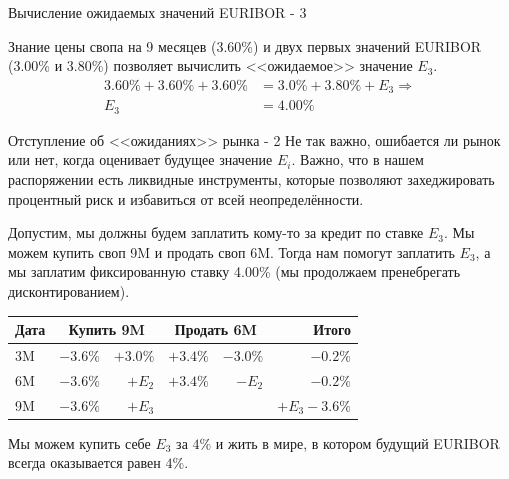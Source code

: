 \documentclass{beamer}
\begin{document}
\begin{frame}{Вычисление ожидаемых значений EURIBOR - 3}
\centering
{}

\justify
Знание цены свопа на 9 месяцев (3.60\%) и двух первых значений EURIBOR (3.00\% и 3.80\%) позволяет вычислить <<ожидаемое>> значение $E_3$.
\begin{align*}
3.60\% + 3.60\% + 3.60\% &= 3.0\% + 3.80\% + E_3 \Rightarrow \\
E_3 &= 4.00\%
\end{align*}
\end{frame}



\begin{frame}{Отступление об <<ожиданиях>> рынка - 2}
\justify
Не так важно, ошибается ли рынок или нет, когда оценивает будущее значение $E_i$. Важно, что в нашем распоряжении есть ликвидные инструменты, которые позволяют захеджировать процентный риск и избавиться от всей неопределённости.

\justify
Допустим, мы должны будем заплатить кому-то за кредит по ставке $E_3$. Мы можем купить своп 9M и продать своп 6M. Тогда нам помогут заплатить $E_3$, а мы заплатим фиксированную ставку 4.00\% (мы продолжаем пренебрегать дисконтированием).

\centering
\begin{tabular}{l|r|r|r|r|r}
Дата    & \multicolumn{2}{c|}{Купить 9M} & \multicolumn{2}{c|}{Продать 6M}  & Итого \\ \hline
3M      & $-3.6\%$  &  $+3.0\%$  & $+3.4\%$ & $-3.0\%$ & $-0.2\%$ \\
6M      & $-3.6\%$  &      $+E_2$  &  $+3.4\%$ & $-E_2$ & $-0.2\%$ \\
9M      & $-3.6\%$  &      $+E_3$  &                      &              & $+E_3-3.6\%$
\end{tabular}

\justify
Мы можем купить себе $E_3$ за $4\%$ и жить в мире, в котором будущий EURIBOR всегда оказывается равен $4\%$.
\end{frame}
\end{document}
